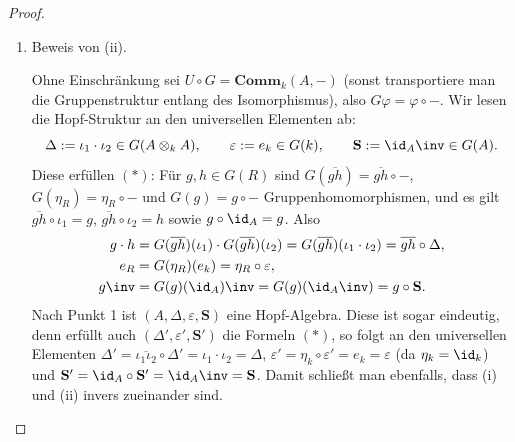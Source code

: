 \documentclass[11pt]{article}
\newcommand{\Comm}{\mathbf{Comm}}
\newcommand{\Sbold}{\mathbf{S}}
\begin{document}
\begin{proof}
\begin{enumerate}
        \item Beweis von (ii). \par
             Ohne Einschränkung sei $U\circ G=\Comm_k(A,-)$ (sonst transportiere man die Gruppenstruktur entlang des
            Isomorphismus), also $G\varphi=\varphi\circ-$. Wir lesen die Hopf-Struktur an den universellen Elementen ab:
            $$\Delta := \iota_1\cdot\iota_2\in G(A\otimes_k A),\qquad \varepsilon := e_k\in G(k),\qquad \Sbold := \id_A\inv\in G(A).$$
            Diese erfüllen $(*)$: Für $g,h\in G(R)$ sind $G(\overline{gh})=\overline{gh}\circ-$, $G(\eta_R)=\eta_R\circ-$ und $G(g)=g\circ-$
            Gruppenhomomorphismen, und es gilt $\overline{gh}\circ\iota_1 = g$, $\overline{gh}\circ\iota_2 = h$ sowie $g\circ\id_A = g$. Also
            \begin{align*}
                g\cdot h &= G(\overline{gh})(\iota_1)\cdot G(\overline{gh})(\iota_2) = G(\overline{gh})(\iota_1\cdot\iota_2) = \overline{gh}\circ\Delta,\\
                e_R &= G(\eta_R)(e_k) = \eta_R\circ\varepsilon,\\
                g\inv &= G(g)(\id_A)\inv = G(g)(\id_A\inv) = g\circ\Sbold.
            \end{align*}
            Nach Punkt 1 ist $(A,\Delta,\varepsilon,\Sbold)$ eine Hopf-Algebra. Diese ist sogar eindeutig, denn erfüllt auch $(\Delta',\varepsilon',\Sbold')$ die Formeln $(*)$, so folgt an den universellen Elementen
            $\Delta' = \overline{\iota_1\iota_2}\circ\Delta' = \iota_1\cdot\iota_2 = \Delta$, $\varepsilon' = \eta_k\circ\varepsilon' = e_k = \varepsilon$ (da $\eta_k=\id_k$) und
            $\Sbold' = \id_A\circ\Sbold' = \id_A\inv = \Sbold$. Damit schließt man ebenfalls, dass (i) und (ii) invers zueinander sind.

\newpage









































\end{enumerate}
\end{proof}
\end{document}

